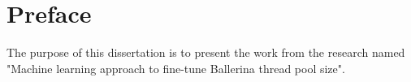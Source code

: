 \chapter*{Preface}

The purpose of this dissertation is to present the work from the research named "Machine learning approach to fine-tune Ballerina thread pool size".